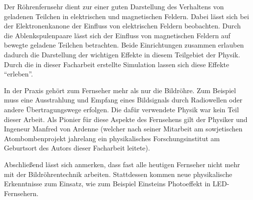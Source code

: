 Der Röhrenfernsehr dient zur einer guten Darstellung des Verhaltens von geladenen Teilchen in elektrischen und magnetischen Feldern.
Dabei lässt sich bei der Elektronenkanone der Einfluss von elektrischen Feldern beobachten.  
Durch die Ablenkspulenpaare lässt sich der Einfluss von magnetischen Feldern auf bewegte geladene Teilchen betrachten.
Beide Einrichtungen zusammen erlauben dadurch die Darstellung der wichtigen Effekte in diesem Teilgebiet der Physik.
Durch die in dieser Facharbeit erstellte Simulation lassen sich diese Effekte "`erleben"'.

In der Praxis gehört zum Fernseher mehr als nur die Bildröhre.
Zum Beispiel muss eine Ausstrahlung und Empfang eines Bildsignals durch Radiowellen oder andere Übertragungswege erfolgen.
Die dafür verwendete Physik war kein Teil dieser Arbeit.
Als Pionier für diese Aspekte des Fernsehens gilt der Physiker und Ingeneur Manfred von Ardenne (welcher nach seiner Mitarbeit am sowjetischen Atombombenprojekt jahrelang ein physikalisches Forschungsinstitut am Geburtsort des Autors dieser Facharbeit leitete).

Abschließend lässt sich anmerken, dass fast alle heutigen Fernseher nicht mehr mit der Bildröhrentechnik arbeiten.
Stattdessen kommen neue physikalische Erkenntnisse zum Einsatz, wie zum Beispiel Einsteins Photoeffekt in LED-Fernsehern.